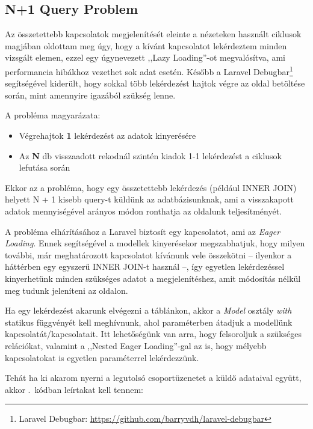 \documentclass[
]{thesis-ekf}
\theoremstyle{definition}
\theoremstyle{remark}
\begin{document}
                \subsection{N+1 Query Problem}
                   Az összetettebb kapcsolatok megjelenítését eleinte a nézeteken használt ciklusok magjában oldottam meg úgy, hogy a kívánt kapcsolatot lekérdeztem minden vizsgált elemen, ezzel egy úgynevezett ,,Lazy Loading''-ot megvalósítva, ami performancia hibákhoz vezethet sok adat esetén. Később a Laravel Debugbar\footnote{Laravel Debugbar: \url{https://github.com/barryvdh/laravel-debugbar}} segítségével kiderült, hogy sokkal több lekérdezést hajtok végre az oldal betöltése során, mint amennyire igazából szükség lenne. 

                    A probléma magyarázata: 
                    \begin{itemize}
                        \item Végrehajtok \textbf{1} lekérdezést az adatok kinyerésére
                        \item Az \textbf{N} db visszaadott rekodnál szintén kiadok 1-1 lekérdezést a ciklusok lefutása során
                    \end{itemize}
                    Ekkor az a probléma, hogy egy összetettebb lekérdezés (például INNER JOIN) helyett N + 1 kisebb query-t küldünk az adatbázisunknak, ami a visszakapott adatok mennyiségével arányos módon ronthatja az oldalunk teljesítményét.
                    
                    A probléma elhárításához a Laravel biztosít egy kapcsolatot, ami az \emph{Eager Loading}. Ennek segítségével a modellek kinyerésekor megszabhatjuk, hogy milyen további, már meghatározott kapcsolatot kívánunk vele összekötni -- ilyenkor a háttérben egy egyszerű INNER JOIN-t használ --, így egyetlen lekérdezéssel kinyerhetünk minden szükséges adatot a megjelenítéshez, amit módosítás nélkül meg tudunk jeleníteni az oldalon. 

                    Ha egy lekérdezést akarunk elvégezni a táblánkon, akkor a \emph{Model} osztály \emph{with} statikus függvényét kell meghívnunk, ahol paraméterben átadjuk a modellünk kapcsolatát/kapcsolatait. Itt lehetőségünk van arra, hogy  felsoroljuk a szükséges relációkat, valamint a ,,Nested Eager Loading''-gal az is, hogy mélyebb kapcsolatokat is egyetlen paraméterrel lekérdezzünk.

                    Tehát ha ki akarom nyerni a legutolsó csoportüzenetet a küldő adataival együtt, akkor \az{\ref{EagerLoadingExample}}.~kódban leírtakat kell tennem:
                    
\end{document}
